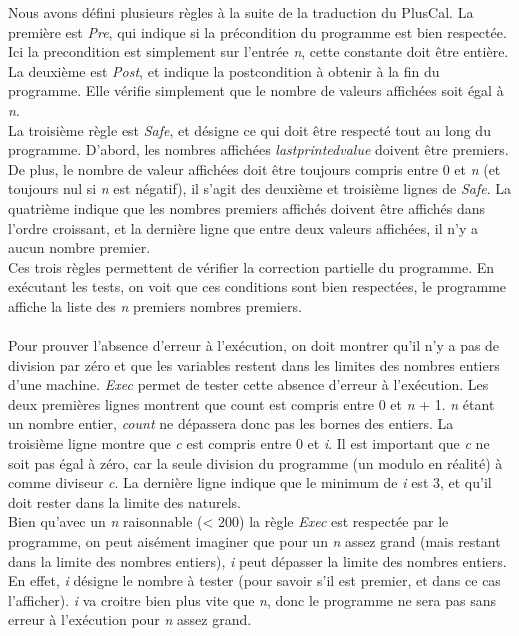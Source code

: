 \documentclass{scrreprt}
\begin{document}
Nous avons défini plusieurs règles à la suite de la traduction du PlusCal.
La première est \emph{Pre}, qui indique si la précondition du programme est bien respectée. Ici la precondition est simplement sur l'entrée \emph{n}, cette constante doit être entière.
\\
La deuxième est \emph{Post}, et indique la postcondition à obtenir à la fin du programme.
Elle vérifie simplement que le nombre de valeurs affichées soit égal à \emph{n}.
\\
La troisième règle est \emph{Safe}, et désigne ce qui doit être respecté tout au long du programme.
D'abord, les nombres affichées \emph{lastprintedvalue} doivent être premiers. De plus, le nombre de valeur affichées doit être toujours compris entre 0 et \emph{n} (et toujours nul si \emph{n} est négatif), il s'agit des deuxième et troisième lignes de \emph{Safe}.
La quatrième indique que les nombres premiers affichés doivent être affichés dans l'ordre croissant, et la dernière ligne que entre deux valeurs affichées, il n'y a aucun nombre premier.
\\
Ces trois règles permettent de vérifier la correction partielle du programme.
En exécutant les tests, on voit que ces conditions sont bien respectées, le programme affiche la liste des \emph{n} premiers nombres premiers.
\\
\\
Pour prouver l'absence d'erreur à l'exécution, on doit montrer qu'il n'y a pas de division par zéro et que les variables restent dans les limites des nombres entiers d'une machine.
\emph{Exec} permet de tester cette absence d'erreur à l'exécution.
Les deux premières lignes montrent que count est compris entre 0 et \emph{n} + 1. \emph{n} étant un nombre entier, \emph{count} ne dépassera donc pas les bornes des entiers.
La troisième ligne montre que \emph{c} est compris entre 0 et \emph{i}. Il est important que \emph{c} ne soit pas égal à zéro, car la seule division du programme (un modulo en réalité) à comme diviseur \emph{c}.
La dernière ligne indique que le minimum de \emph{i} est 3, et qu'il doit rester dans la limite des naturels.
\\
Bien qu'avec un \emph{n} raisonnable (< 200) la règle \emph{Exec} est respectée par le programme, on peut aisément imaginer que pour un \emph{n} assez grand (mais restant dans la limite des nombres entiers), \emph{i} peut dépasser la limite des nombres entiers.
En effet, \emph{i} désigne le nombre à tester (pour savoir s'il est premier, et dans ce cas l'afficher). \emph{ i} va croitre bien plus vite que \emph{n}, donc le programme ne sera pas sans erreur à l'exécution pour \emph{n} assez grand.
\end{document}

